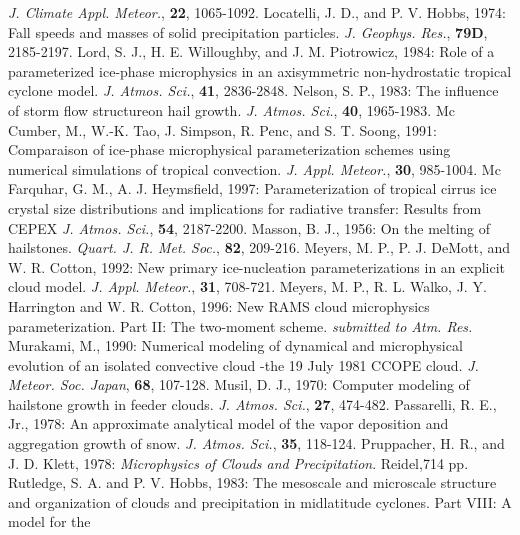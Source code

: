       {\it J. Climate Appl. Meteor.},
      {\bf 22},
      1065-1092.
\decrefname
Locatelli, J. D., and P. V. Hobbs, 1974:
      Fall speeds and masses of solid precipitation particles.
      {\it J. Geophys. Res.},
      {\bf 79D},
      2185-2197.
\decrefname
Lord, S. J., H. E. Willoughby, and J. M. Piotrowicz, 1984:
      Role of a parameterized ice-phase microphysics in an axisymmetric
      non-hydrostatic tropical  cyclone model.
      {\it J. Atmos. Sci.},
      {\bf 41},
      2836-2848.
\decrefname
Nelson, S. P., 1983:
      The influence of storm flow structureon hail growth.
      {\it J. Atmos. Sci.},
      {\bf 40},
      1965-1983.
\decrefname
Mc Cumber, M., W.-K. Tao, J. Simpson, R. Penc, and S. T. Soong, 1991:
      Comparaison of ice-phase microphysical parameterization schemes using
      numerical simulations of tropical convection.
      {\it J. Appl. Meteor.},
      {\bf 30},
      985-1004.
\decrefname
Mc Farquhar, G. M., A. J. Heymsfield, 1997:
      Parameterization of tropical cirrus ice crystal size distributions and
      implications for radiative transfer: Results from CEPEX
      {\it J. Atmos. Sci.},
      {\bf 54},
      2187-2200.
\decrefname
Masson, B. J., 1956:
      On the melting of hailstones.
      {\it Quart. J. R. Met. Soc.},
      {\bf 82},
      209-216.
\decrefname
Meyers, M. P., P. J. DeMott, and W. R. Cotton, 1992:
      New primary ice-nucleation parameterizations in an explicit cloud model.
      {\it J. Appl. Meteor.},
      {\bf 31},
      708-721.
\decrefname
Meyers, M. P., R. L. Walko, J. Y. Harrington and W. R. Cotton, 1996:
      New RAMS cloud microphysics parameterization. Part II: The two-moment
      scheme.
      {\it submitted to Atm. Res.}
\decrefname
Murakami, M., 1990:
      Numerical modeling of dynamical and microphysical evolution of an isolated
      convective cloud -the 19 July 1981 CCOPE cloud.
      {\it J. Meteor. Soc. Japan},
      {\bf 68},
      107-128.
\decrefname
Musil, D. J., 1970:
      Computer modeling of hailstone growth in feeder clouds.
      {\it J. Atmos. Sci.},
      {\bf 27},
      474-482.
\decrefname
Passarelli, R. E., Jr., 1978:
      An approximate analytical model of the vapor deposition and aggregation
      growth of snow.
      {\it J. Atmos. Sci.},
      {\bf 35},
      118-124.
\decrefname
Pruppacher, H. R., and J. D. Klett, 1978:
      {\it Microphysics of Clouds and Precipitation}.
      Reidel,714 pp.
\decrefname
Rutledge, S. A. and P. V. Hobbs, 1983:
      The mesoscale and microscale structure and organization of clouds and
      precipitation in midlatitude cyclones. Part VIII: A model for the
